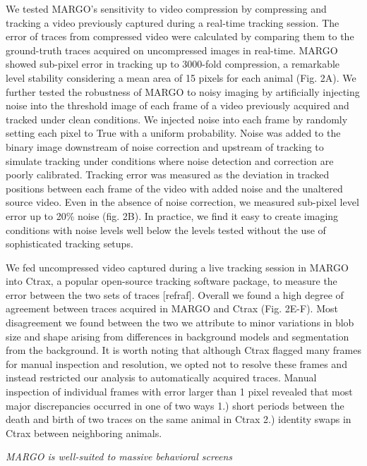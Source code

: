 \documentclass[10pt]{article}
\begin{document}
\begin{multicols}{2}
We tested MARGO's sensitivity to video compression by compressing and tracking a video previously captured during a real-time tracking session. The error of traces from compressed video were calculated by comparing them to the ground-truth traces acquired on uncompressed images in real-time. MARGO showed sub-pixel error in tracking up to 3000-fold compression, a remarkable level stability considering a mean area of 15 pixels for each animal (Fig. 2A). We further tested the robustness of MARGO to noisy imaging by artificially injecting noise into the threshold image of each frame of a video previously acquired and tracked under clean conditions. We injected noise into each frame by randomly setting each pixel to True with a uniform probability. Noise was added to the binary image downstream of noise correction and upstream of tracking to simulate tracking under conditions where noise detection and correction are poorly calibrated. Tracking error was measured as the deviation in tracked positions between each frame of the video with added noise and the unaltered source video.  Even in the absence of noise correction, we measured sub-pixel level error up to 20\% noise (fig. 2B). In practice, we find it easy to create imaging conditions with noise levels well below the levels tested without the use of sophisticated tracking setups.

We fed uncompressed video captured during a live tracking session in MARGO into Ctrax, a popular open-source tracking software package, to measure the error between the two sets of traces [refraf]. Overall we found a high degree of agreement between traces acquired in MARGO and Ctrax (Fig. 2E-F). Most disagreement we found between the two we attribute to minor variations in blob size and shape arising from differences in background models and segmentation from the background. It is worth noting that although Ctrax flagged many frames for manual inspection and resolution, we opted not to resolve these frames and instead restricted our analysis to automatically acquired traces. Manual inspection of individual frames with error larger than 1 pixel revealed that most major discrepancies occurred in one of two ways 1.) short periods between the death and birth of two traces on the same animal in Ctrax 2.) identity swaps in Ctrax between neighboring animals.

\textit{MARGO is well-suited to massive behavioral screens}


\end{multicols}
\end{document}
